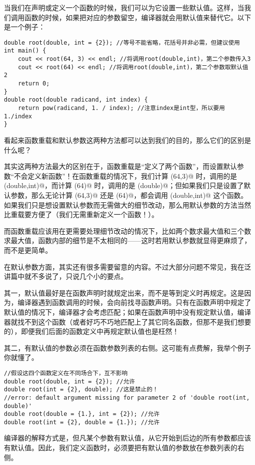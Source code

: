 当我们在声明或定义一个函数的时候，我们可以为它设置一些默认值。这样，当我们调用函数的时候，如果把对应的参数留空，编译器就会用默认值来替代它。以下是一个例子：
\begin{lstlisting}
double root(double, int = {2}); //等号不能省略，花括号并非必需，但建议使用
int main() {
    cout << root(64, 3) << endl; //将调用root(double,int)，第二个参数传入3
    cout << root(64) << endl; //将调用root(double,int)，第二个参数取默认值2
    return 0;
}
double root(double radicand, int index) {
    return pow(radicand, 1. / index); //注意index是int型，所以要用1./index
}
\end{lstlisting}
看起来函数重载和默认参数这两种方法都可以达到我们的目的，那么它们的区别是什么呢？\par
其实这两种方法最大的区别在于，函数重载是``定义了两个函数''，而设置默认参数``不会定义新函数''！在函数重载的情况下，我们计算 \lstinline@root(64,3)@ 时，调用的是 \lstinline@root(double,int)@，而计算 \lstinline@root(64)@ 时，调用的是 \lstinline@root(double)@；但如果我们只是设置了默认参数，那么无论计算 \lstinline@root(64,3)@ 还是 \lstinline@root(64)@，都会调用 \lstinline@root(double,int)@ 这个函数。如果我们只是想设置默认参数而无需做大的细节改动，那么用默认参数的方法当然比重载要方便了（我们无需重新定义一个函数！）。\par
而函数重载应该用在更需要处理细节改动的情况下，比如两个数求最大值和三个数求最大值，函数内部的细节是不太相同的——这时若用默认参数就显得更麻烦了，而不是更简单。\par
在默认参数方面，其实还有很多需要留意的内容。不过大部分问题不常见，我在泛讲篇中就不多说了，只说几个小的要点。\par
其一，默认值最好是在函数声明时就规定出来，而不是等到定义时再规定。这是因为，编译器遇到函数调用的时候，会向前找寻函数声明。只有在函数声明中规定了默认值的情况下，编译器才会考虑匹配；如果在函数声明中没有规定默认值，编译器就找不到这个函数（或者好巧不巧地匹配上了其它同名函数，但那不是我们想要的），即便我们后面的函数定义中再规定默认值也是枉然！\par
其二，有默认值的参数必须在函数参数列表的右侧。这可能有点费解，我举个例子你就懂了。
\begin{lstlisting}
//假设这四个函数定义在不同场合下，互不影响
double root(double, int = {2}); //允许
double root(int = {2}, double); //这是禁止的！
//error: default argument missing for parameter 2 of 'double root(int, double)'
double root(double = {1.}, int = {2}); //允许
double root(int = {2}, double = {1.}); //允许
\end{lstlisting}
编译器的解释方式是，但凡某个参数有默认值，从它开始到后边的所有参数都应该有默认值。因此，我们定义函数时，必须要把有默认值的参数放在参数列表的右侧。\par
